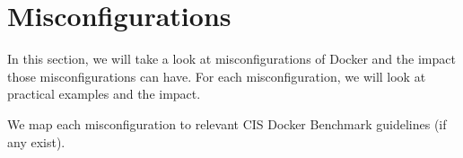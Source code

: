 \section{Misconfigurations}\label{section:misconfigurations}
In this section, we will take a look at misconfigurations of Docker and the impact those misconfigurations can have. For each misconfiguration, we will look at practical examples and the impact.

\medskip

We map each misconfiguration to relevant CIS Docker Benchmark guidelines (if any exist).








